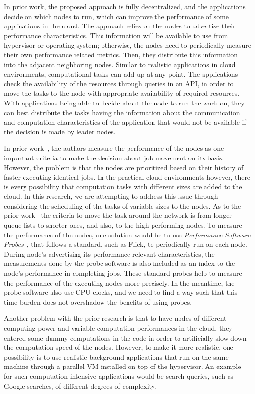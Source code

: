 \documentclass{sig-alternate}
\begin{document}
In prior work\cite{peterson:decentralized}, the proposed approach is fully decentralized, and the applications decide on which nodes to run, which can improve the performance of some applications in the cloud. The approach relies on the nodes to advertise their performance characteristics. This information will be available to use from hypervisor or operating system; otherwise, the nodes need to periodically measure their own performance related metrics. Then, they distribute this information into the adjacent neighboring nodes. Similar to realistic applications in cloud environments, computational tasks can add up at any point. The applications check the availability of the resources through queries in an API, in order to move the tasks to the node with appropriate availability of required resources. With applications being able to decide about the node to run the work on, they can best distribute the tasks having the information about the communication and computation characteristics of the application that would not be available if the decision is made by leader nodes.

In prior work~\cite{peterson:decentralized}, the authors measure the performance of the nodes as one important criteria to make the decision about job movement on its basis. However, the problem is that the nodes are prioritized based on their history of faster executing identical jobs. In the practical cloud environments however, there is every possibility that computation tasks with different sizes are added to the cloud. In this research, we are attempting to address this issue through considering the scheduling of the tasks of variable sizes to the nodes. As to the prior work~\cite{peterson:decentralized} the criteria to move the task around the network is from longer queue lists to shorter ones, and also, to the high-performing nodes. To measure the performance of the nodes, one solution would be to use \textit{Performance Software Probes}~\cite{strube:probe}, that follows a standard, such as Flick\cite{salah:performance}, to periodically run on each node. During node's advertising its performance relevant characteristics, the measurements done by the probe software is also included as an index to the node's performance in completing jobs. These standard probes help to measure the performance of the executing nodes more precisely. In the meantime, the probe software also use CPU clocks, and we need to find a way such that this time burden does not overshadow the benefits of using probes.

Another problem with the prior research\cite{peterson:decentralized} is that to have nodes of different computing power and variable computation performances in the cloud, they entered some dummy computations in the code in order to artificially slow down the computation speed of the nodes. However, to make it more realistic, one possibility is to use realistic background applications that run on the same machine through a parallel VM installed on top of the hypervisor. An example for such computation-intensive applications would be search queries, such as Google searches, of different degrees of complexity.
\end{document}
